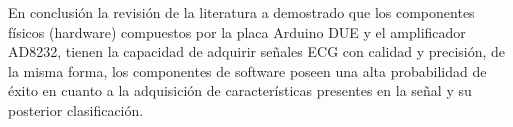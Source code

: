 En conclusión la revisión de la literatura a demostrado que los componentes físicos (hardware) compuestos por la placa Arduino DUE y el amplificador AD8232, tienen la capacidad de adquirir señales ECG con calidad y precisión, de la misma forma, los componentes de software poseen una alta probabilidad de éxito en cuanto a la adquisición de características presentes en la señal y su posterior clasificación.

\label{sec:Mat_Ref}